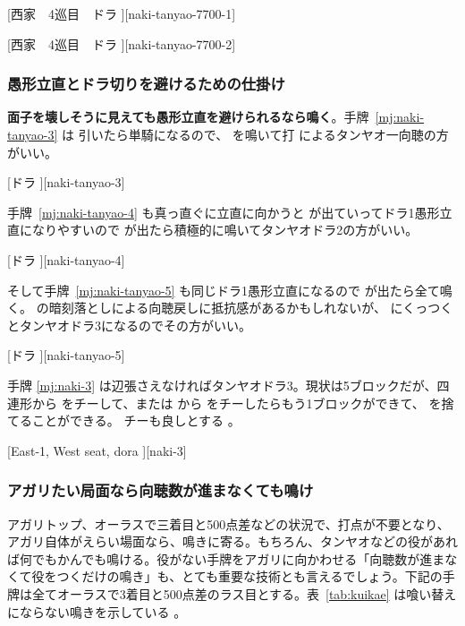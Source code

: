 \documentclass[../nankiru_main.tex]{subfiles}
\begin{document}
[西家　4巡目　ドラ ][naki-tanyao-7700-1]

[西家　4巡目　ドラ ][naki-tanyao-7700-2]


\subsubsection*{愚形立直とドラ切りを避けるための仕掛け}

\textbf{面子を壊しそうに見えても愚形立直を避けられるなら鳴く}\citep{nemata-133}。手牌~\ref{mj:naki-tanyao-3} は  引いたら単騎になるので、 を鳴いて打  によるタンヤオ一向聴の方がいい。

[ドラ ][naki-tanyao-3]

手牌~\ref{mj:naki-tanyao-4} も真っ直ぐに立直に向かうと  が出ていってドラ1愚形立直になりやすいので  が出たら積極的に鳴いてタンヤオドラ2の方がいい\citep{nemata-133}。

[ドラ ][naki-tanyao-4]

そして手牌~\ref{mj:naki-tanyao-5} も同じドラ1愚形立直になるので  が出たら全て鳴く。 の暗刻落としによる向聴戻しに抵抗感があるかもしれないが、 にくっつくとタンヤオドラ3になるのでその方がいい\citep{nemata-133}。

[ドラ ][naki-tanyao-5]

手牌 \ref{mj:naki-3} は辺張さえなければタンヤオドラ3。現状は5ブロックだが、四連形から  をチーして、または  から  をチーしたらもう1ブロックができて、 を捨てることができる。 チーも良しとする \citep[][p.~61]{hirasawa-naki}。

[East-1, West seat, dora ][naki-3]


\subsubsection*{アガリたい局面なら向聴数が進まなくても鳴け}

アガリトップ、オーラスで三着目と500点差などの状況で、打点が不要となり、アガリ自体がえらい場面なら、鳴きに寄る。もちろん、タンヤオなどの役があれば何でもかんでも鳴ける。役がない手牌をアガリに向かわせる「向聴数が進まなくて役をつくだけの鳴き」も、とても重要な技術とも言えるでしょう\citep{mark2-tanyao-naki}。下記の手牌は全てオーラスで3着目と500点差のラス目とする。表~\ref{tab:kuikae} は喰い替えにならない鳴きを示している \citep[][p.~20]{kawamura-naki}。
\end{document}
